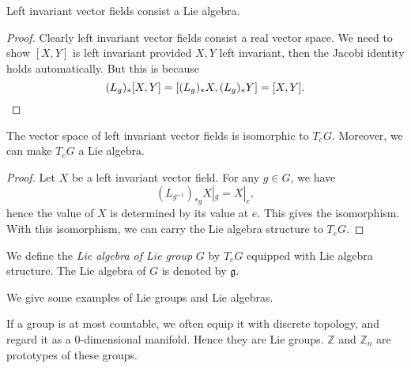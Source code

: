 \begin{prop}
    Left invariant vector fields consist a Lie algebra.
\end{prop}
\begin{proof}
    Clearly left invariant vector fields consist a real vector space.
    We need to show $[X,Y]$ is left invariant provided $X,Y$ left invariant, then the Jacobi identity holds automatically.
    But this is because 
    \[(L_g)_*[X,Y]=[(L_g)_*X,(L_g)_*Y]=[X,Y].\qedhere\]
\end{proof}

\begin{prop}
    The vector space of left invariant vector fields is isomorphic to $T_eG$.
    Moreover, we can make $T_eG$ a Lie algebra.
\end{prop}
\begin{proof}
    Let $X$ be a left invariant vector field.
    For any $g\in G$, we have
    \[(L_{g^{-1}})_{*g}X|_g=X|_e,\]
    hence the value of $X$ is determined by its value at $e$.
    This gives the isomorphism.
    With this isomorphism, we can carry the Lie algebra structure to $T_eG$.
\end{proof}

\begin{defn}
    We define the \emph{Lie algebra of Lie group} $G$ by $T_eG$ equipped with Lie algebra structure.
    The Lie algebra of $G$ is denoted by $\mathfrak{g}$.
\end{defn}

We give some examples of Lie groups and Lie algebras.

\begin{eg}
    If a group is at most countable, we often equip it with discrete topology, and regard it as a $0$-dimensional manifold.
    Hence they are Lie groups.
    $\mathbb{Z}$ and $\mathbb{Z}_n$ are prototypes of these groups.
\end{eg}

